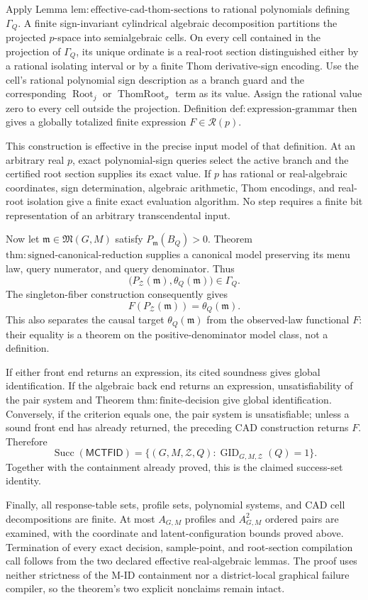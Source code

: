 Apply Lemma \(\mathrm{lem:effective\text{-}cad\text{-}thom\text{-}sections}\) to rational polynomials defining \(\Gamma_Q\).  A finite sign-invariant cylindrical algebraic decomposition partitions the projected \(p\)-space into semialgebraic cells.  On every cell contained in the projection of \(\Gamma_Q\), its unique ordinate is a real-root section distinguished either by a rational isolating interval or by a finite Thom derivative-sign encoding.  Use the cell's rational polynomial sign description as a branch guard and the corresponding \(\operatorname{Root}_j\) or \(\operatorname{ThomRoot}_{\sigma}\) term as its value.  Assign the rational value zero to every cell outside the projection.  Definition \(\mathrm{def:expression\text{-}grammar}\) then gives a globally totalized finite expression \(F\in\mathcal R(p)\).

This construction is effective in the precise input model of that definition.  At an arbitrary real \(p\), exact polynomial-sign queries select the active branch and the certified root section supplies its exact value.  If \(p\) has rational or real-algebraic coordinates, sign determination, algebraic arithmetic, Thom encodings, and real-root isolation give a finite exact evaluation algorithm.  No step requires a finite bit representation of an arbitrary transcendental input.

Now let \(\mathfrak m\in\mathfrak M(G,M)\) satisfy \(P_{\mathfrak m}(B_Q)>0\).  Theorem \(\mathrm{thm:signed\text{-}canonical\text{-}reduction}\) supplies a canonical model preserving its menu law, query numerator, and query denominator.  Thus
\[
 \bigl(P_{\mathcal Z}(\mathfrak m),\theta_Q(\mathfrak m)\bigr)
 \in\Gamma_Q.
\]
The singleton-fiber construction consequently gives
\[
 F(P_{\mathcal Z}(\mathfrak m))=\theta_Q(\mathfrak m).
\]
This also separates the causal target \(\theta_Q(\mathfrak m)\) from the observed-law functional \(F\): their equality is a theorem on the positive-denominator model class, not a definition.

If either front end returns an expression, its cited soundness gives global identification.  If the algebraic back end returns an expression, unsatisfiability of the pair system and Theorem \(\mathrm{thm:finite\text{-}decision}\) give global identification.  Conversely, if the criterion equals one, the pair system is unsatisfiable; unless a sound front end has already returned, the preceding CAD construction returns \(F\).  Therefore
\[
 \operatorname{Succ}(\mathsf{MCTFID})
 =\{(G,M,\mathcal Z,Q):\operatorname{GID}_{G,M,\mathcal Z}(Q)=1\}.
\]
Together with the containment already proved, this is the claimed success-set identity.

Finally, all response-table sets, profile sets, polynomial systems, and CAD cell decompositions are finite.  At most \(A_{G,M}\) profiles and \(A_{G,M}^2\) ordered pairs are examined, with the coordinate and latent-configuration bounds proved above.  Termination of every exact decision, sample-point, and root-section compilation call follows from the two declared effective real-algebraic lemmas.  The proof uses neither strictness of the M-ID containment nor a district-local graphical failure compiler, so the theorem's two explicit nonclaims remain intact.